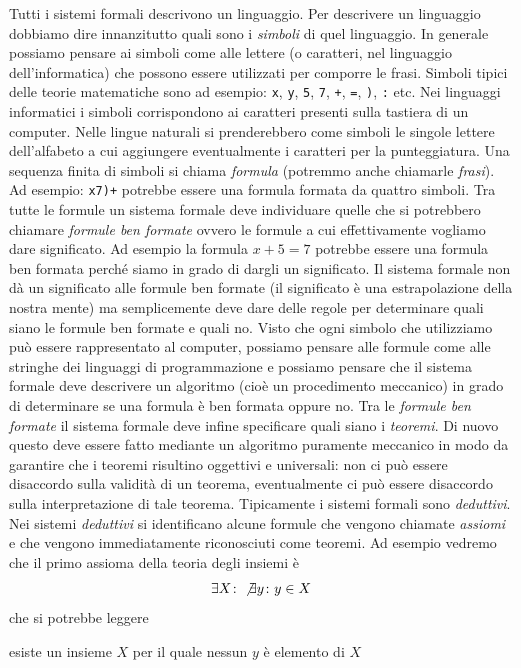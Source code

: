 Tutti i sistemi formali descrivono un linguaggio.
Per descrivere un linguaggio dobbiamo dire innanzitutto quali sono i \emph{simboli}%
%
di quel linguaggio. In generale possiamo pensare ai simboli come alle lettere 
(o caratteri, nel linguaggio dell'informatica) che possono essere utilizzati per comporre le frasi.
Simboli tipici delle teorie matematiche sono ad esempio: 
\texttt{x}, \texttt{y}, \texttt{5}, \texttt{7}, 
\texttt{+}, \texttt{=}, \texttt{)}, \texttt{:} etc.
Nei linguaggi informatici i simboli corrispondono ai caratteri presenti sulla tastiera 
di un computer. 
Nelle lingue naturali si prenderebbero come simboli le singole lettere dell'alfabeto
a cui aggiungere eventualmente i caratteri per la punteggiatura.
Una sequenza finita di simboli si chiama \emph{formula}%
%
 (potremmo anche chiamarle \emph{frasi}).
Ad esempio: \texttt{x7)+} potrebbe essere una formula formata da quattro simboli.
Tra tutte le formule un sistema formale deve individuare quelle che si potrebbero chiamare 
\emph{formule ben formate} ovvero le formule a cui effettivamente vogliamo dare significato.
Ad esempio la formula $x+5=7$ potrebbe essere una formula ben formata perché siamo in grado 
di dargli un significato.
Il sistema formale non dà un significato alle formule ben formate 
(il significato è una estrapolazione della nostra mente) ma semplicemente deve dare delle regole 
per determinare quali siano le formule ben formate e quali no.
Visto che ogni simbolo che utilizziamo può essere rappresentato al computer, possiamo pensare 
alle formule come alle stringhe dei linguaggi di programmazione e possiamo pensare che il sistema formale 
deve descrivere un algoritmo (cioè un procedimento meccanico) in grado di determinare 
se una formula è ben formata oppure no.
Tra le \emph{formule ben formate} il sistema formale deve infine specificare quali 
siano i \emph{teoremi}. 
Di nuovo questo deve essere fatto mediante un algoritmo puramente meccanico 
in modo da garantire che i teoremi risultino oggettivi e universali: 
non ci può essere disaccordo sulla validità di un teorema, eventualmente 
ci può essere disaccordo 
sulla interpretazione di tale teorema.
Tipicamente i sistemi formali sono \emph{deduttivi}.
Nei sistemi \emph{deduttivi} si identificano alcune formule che vengono 
chiamate
 \emph{assiomi} e che vengono immediatamente riconosciuti come teoremi.
Ad esempio vedremo che il primo assioma della teoria degli insiemi è 
\[
  \exists X\colon \not \exists y\colon y\in X
\]
che si potrebbe leggere 
\begin{displayquote}
esiste un insieme $X$ per il quale nessun $y$ è elemento di $X$
\end{displayquote}
